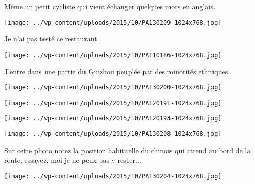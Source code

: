  Même un petit cycliste qui vient échanger quelques mots en anglais. 
\begin{center} \texttt{[image: ../wp-content/uploads/2015/10/PA130209-1024x768.jpg]} \end{center}

\pagebreak
 Je n'ai pas testé ce restaurant. 
\begin{center} \texttt{[image: ../wp-content/uploads/2015/10/PA110186-1024x768.jpg]} \end{center}

 J'entre dans une partie du Guizhou peuplée par des minorités ethniques. 
\begin{center} \texttt{[image: ../wp-content/uploads/2015/10/PA130200-1024x768.jpg]} \end{center}
\begin{center} \texttt{[image: ../wp-content/uploads/2015/10/PA120191-1024x768.jpg]} \end{center}
\begin{center} \texttt{[image: ../wp-content/uploads/2015/10/PA120193-1024x768.jpg]} \end{center}
\begin{center} \texttt{[image: ../wp-content/uploads/2015/10/PA130208-1024x768.jpg]} \end{center}

 Sur cette photo notez la position habituelle du chinois qui attend au bord de la route, essayez, moi je ne peux pas y rester...
\begin{center} \texttt{[image: ../wp-content/uploads/2015/10/PA130204-1024x768.jpg]} \end{center}

